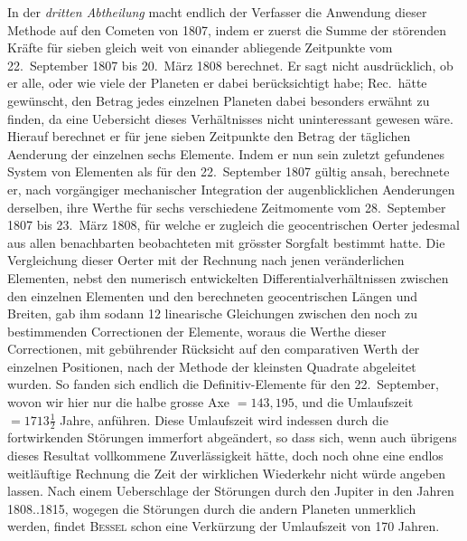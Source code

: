 In der \emph{dritten Abtheilung} macht endlich der Verfasser die Anwendung dieser Methode auf den Cometen von 1807, indem er zuerst die Summe der störenden Kräfte für sieben gleich weit von einander abliegende Zeitpunkte vom 22.\ September 1807 bis 20.\ März 1808 berechnet. Er sagt nicht ausdrücklich, ob er alle, oder wie viele der Planeten er dabei berücksichtigt habe; Rec.\ hätte gewünscht, den Betrag jedes einzelnen Planeten dabei besonders erwähnt zu finden, da eine Uebersicht dieses Verhältnisses nicht uninteressant gewesen wäre. Hierauf berechnet er für jene sieben Zeitpunkte den Betrag der täglichen Aenderung der einzelnen sechs Elemente. Indem er nun sein zuletzt gefundenes System von Elementen als für den 22.\ September 1807 gültig ansah, berechnete er, nach vorgängiger mechanischer Integration der augenblicklichen Aenderungen derselben, ihre Werthe für sechs verschiedene Zeitmomente vom 28.\ September 1807 bis 23.\ März 1808, für welche er zugleich die geocentrischen Oerter jedesmal aus allen benachbarten beobachteten mit grösster Sorgfalt bestimmt hatte. Die Vergleichung dieser Oerter mit der Rechnung nach jenen veränderlichen Elementen, nebst den numerisch entwickelten Differentialverhältnissen zwischen den einzelnen Elementen und den berechneten geocentrischen Längen und Breiten, gab ihm sodann 12 linearische Gleichungen zwischen den noch zu bestimmenden Correctionen der Elemente, woraus die Werthe dieser Correctionen, mit gebührender Rücksicht auf den comparativen Werth der einzelnen Positionen, nach der Methode der kleinsten Quadrate abgeleitet wurden. So fanden sich endlich die Definitiv-Elemente für den 22.\ September, wovon wir hier nur die halbe grosse Axe $= 143{,}195$, und die Umlaufszeit $= 1713\tfrac{1}{2}$ Jahre, anführen. Diese Umlaufszeit wird indessen durch die fortwirkenden Störungen immerfort abgeändert, so dass sich, wenn auch übrigens dieses Resultat vollkommene Zuverlässigkeit hätte, doch noch ohne eine endlos weitläuftige Rechnung die Zeit der wirklichen Wiederkehr nicht würde angeben lassen. Nach einem Ueberschlage der Störungen durch den Jupiter in den Jahren 1808..1815, wogegen die Störungen durch die andern Planeten unmerklich werden, findet \textsc{Bessel} schon eine Verkürzung der Umlaufszeit von 170 Jahren.

